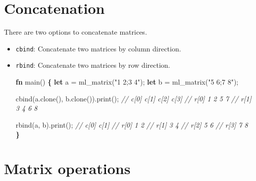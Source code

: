 \documentclass[]{book}
\newenvironment{Shaded}{\begin{snugshade}}{\end{snugshade}}
\newcommand{\CommentTok}[1]{\textcolor[rgb]{0.56,0.35,0.01}{\textit{#1}}}
\newcommand{\KeywordTok}[1]{\textcolor[rgb]{0.13,0.29,0.53}{\textbf{#1}}}
\newcommand{\NormalTok}[1]{#1}
\newcommand{\OperatorTok}[1]{\textcolor[rgb]{0.81,0.36,0.00}{\textbf{#1}}}
\newcommand{\StringTok}[1]{\textcolor[rgb]{0.31,0.60,0.02}{#1}}
\begin{document}
\hypertarget{concatenation-1}{%
\section{Concatenation}\label{concatenation-1}}

There are two options to concatenate matrices.

\begin{itemize}
\item
  \texttt{cbind}: Concatenate two matrices by column direction.
\item
  \texttt{rbind}: Concatenate two matrices by row direction.

\begin{Shaded}
\begin{Highlighting}[]
\KeywordTok{fn}\NormalTok{ main() }\OperatorTok{\{}
    \KeywordTok{let}\NormalTok{ a = ml_matrix(}\StringTok{"1 2;3 4"}\NormalTok{);}
    \KeywordTok{let}\NormalTok{ b = ml_matrix(}\StringTok{"5 6;7 8"}\NormalTok{);}

\NormalTok{    cbind(a.clone(), b.clone()).print();}
    \CommentTok{//      c[0] c[1] c[2] c[3]}
    \CommentTok{// r[0]    1    2    5    7}
    \CommentTok{// r[1]    3    4    6    8}

\NormalTok{    rbind(a, b).print();}
    \CommentTok{//      c[0] c[1]}
    \CommentTok{// r[0]    1    2}
    \CommentTok{// r[1]    3    4}
    \CommentTok{// r[2]    5    6}
    \CommentTok{// r[3]    7    8}
\OperatorTok{\}}
\end{Highlighting}
\end{Shaded}
\end{itemize}

\hypertarget{matrix-operations}{%
\section{Matrix operations}\label{matrix-operations}}
\end{document}
